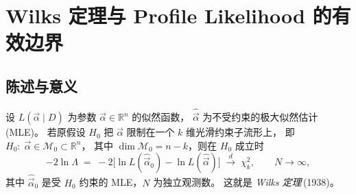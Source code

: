 %
%
%
%
%
%

\providecommand{\StatusReport}{文献~[1]}

\section{Wilks 定理与 Profile Likelihood 的有效边界}
\label{sec:partIb:wilks}

\subsection{陈述与意义}
\label{sec:partIb:wilks:statement}

设 $L(\vec{\alpha}\mid D)$ 为参数 $\vec{\alpha}\in\mathbb R^{n}$ 的似然函数，
$\hat{\vec{\alpha}}$ 为不受约束的极大似然估计 (MLE)。
若原假设 $H_0$ 把 $\vec{\alpha}$ 限制在一个 $k$ 维光滑约束子流形上，
即 $H_0:\;\vec{\alpha}\in\mathcal M_0\subset\mathbb R^{n}$，
其中 $\dim\mathcal M_0 = n-k$，则在 $H_0$ 成立时
\begin{equation}
  -2\ln\Lambda
  \;=\;
  -2\bigl[\ln L(\hat{\vec{\alpha}}_0)-\ln L(\hat{\vec{\alpha}})\bigr]
  \;\xrightarrow{d}\;\chi^2_{k},
  \qquad N\to\infty,
  \label{eq:partIb:wilks:thm}
\end{equation}
其中 $\hat{\vec{\alpha}}_0$ 是受 $H_0$ 约束的 MLE，$N$ 为独立观测数。
这就是 \emph{Wilks 定理}\,(1938)。

